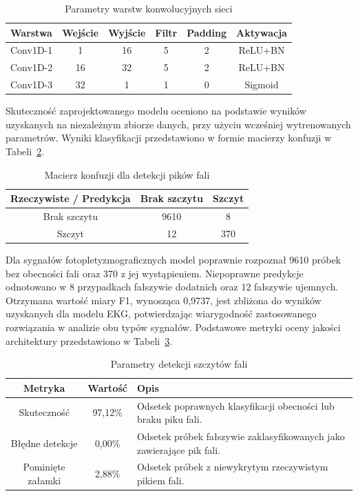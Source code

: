 \documentclass[journal]{IEEEtran}
\begin{document}
\begin{table}[ht]
\centering
\caption{Parametry warstw konwolucyjnych sieci}
\label{tab:ppg_layers}
\begin{tabular}{|l|c|c|c|c|c|}
\hline
\textbf{Warstwa} & \textbf{Wejście} & \textbf{Wyjście} & \textbf{Filtr} & \textbf{Padding} & \textbf{Aktywacja} \\
\hline
Conv1D-1 & 1 & 16 & 5 & 2 & ReLU+BN \\
Conv1D-2 & 16 & 32 & 5 & 2 & ReLU+BN \\
Conv1D-3 & 32 & 1 & 1 & 0 & Sigmoid \\
\hline
\end{tabular}
\end{table}

\newpage
Skuteczność zaprojektowanego modelu oceniono na podstawie wyników uzyskanych na niezależnym zbiorze danych, przy użyciu wcześniej wytrenowanych parametrów. Wyniki klasyfikacji przedstawiono w formie macierzy konfuzji w Tabeli~\ref{tab:conf_matrix_ppg}.

\begin{table}[ht]
\centering
\caption{Macierz konfuzji dla detekcji pików fali}
\label{tab:conf_matrix_ppg}
\begin{tabular}{|c|c|c|}
\hline
\textbf{Rzeczywiste / Predykcja} & \textbf{Brak szczytu } & \textbf{Szczyt} \\
\hline
Brak szczytu  & 9610 & 8 \\
\hline
Szczyt  & 12 & 370 \\
\hline
\end{tabular}
\end{table}

Dla sygnałów fotopletyzmograficznych model poprawnie rozpoznał 9610 próbek bez obecności fali oraz 370 z jej wystąpieniem. Niepoprawne predykcje odnotowano w 8 przypadkach fałszywie dodatnich oraz 12  fałszywie ujemnych. Otrzymana wartość miary F1, wynosząca 0,9737, jest zbliżona do wyników uzyskanych dla modelu EKG, potwierdzając wiarygodność zastosowanego rozwiązania w analizie obu typów sygnałów.
Podstawowe metryki oceny jakości architektury przedstawiono w Tabeli~\ref{tab:metrics_ppg}.

\begin{table}[ht]
\centering
\caption{Parametry detekcji szczytów fali}
\label{tab:metrics_ppg}
\begin{tabular}{|c|c|p{4.6cm}|}
\hline
\textbf{Metryka} & \textbf{Wartość} & \textbf{Opis} \\
\hline
Skuteczność & 97,12\% & Odsetek poprawnych klasyfikacji obecności lub braku piku fali. \\
\hline
Błędne detekcje & 0,00\% & Odsetek próbek fałszywie zaklasyfikowanych jako zawierające pik fali. \\
\hline
Pominięte załamki & 2,88\% & Odsetek próbek z niewykrytym rzeczywistym pikiem fali. \\
\hline
\end{tabular}
\end{table}
\end{document}
